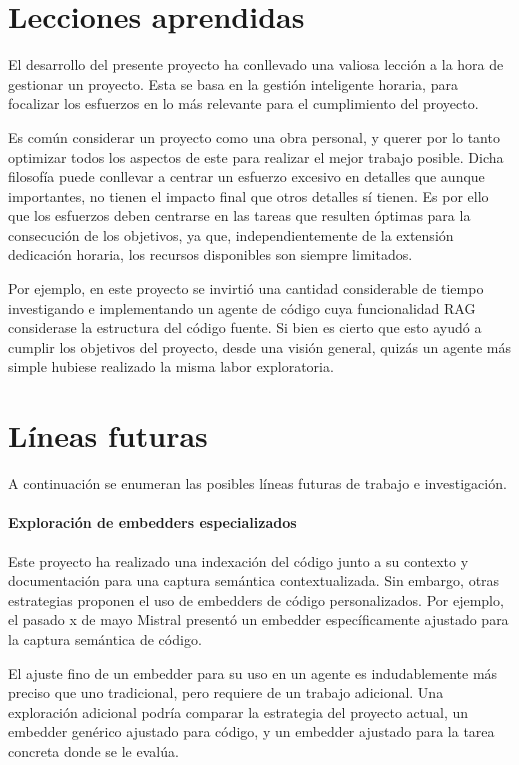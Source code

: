 \section{Lecciones aprendidas}
El desarrollo del presente proyecto ha conllevado una valiosa lección a la hora de gestionar un proyecto. Esta se basa en la gestión inteligente horaria, para focalizar los esfuerzos en lo más relevante para el cumplimiento del proyecto.

Es común considerar un proyecto como una obra personal, y querer por lo tanto optimizar todos los aspectos de este para realizar el mejor trabajo posible. Dicha filosofía puede conllevar a centrar un esfuerzo excesivo en detalles que aunque importantes, no tienen el impacto final que otros detalles sí tienen. Es por ello que los esfuerzos deben centrarse en las tareas que resulten óptimas para la consecución de los objetivos, ya que, independientemente de la extensión dedicación horaria, los recursos disponibles son siempre limitados.

Por ejemplo, en este proyecto se invirtió una cantidad considerable de tiempo investigando e implementando un agente de código cuya funcionalidad RAG considerase la estructura del código fuente. Si bien es cierto que esto ayudó a cumplir los objetivos del proyecto, desde una visión general, quizás un agente más simple hubiese realizado la misma labor exploratoria. 

\section{Líneas futuras}
A continuación se enumeran las posibles líneas futuras de trabajo e investigación.

\paragraph{Exploración de embedders especializados} Este proyecto ha realizado una indexación del código junto a su contexto y documentación para una captura semántica contextualizada. Sin embargo, otras estrategias proponen el uso de embedders de código personalizados. Por ejemplo, el pasado x de mayo Mistral presentó un embedder específicamente ajustado para la captura semántica de código. 

El ajuste fino de un embedder para su uso en un agente es indudablemente más preciso que uno tradicional, pero requiere de un trabajo adicional. Una exploración adicional podría comparar la estrategia del proyecto actual, un embedder genérico ajustado para código, y un embedder ajustado para la tarea concreta donde se le evalúa. 
